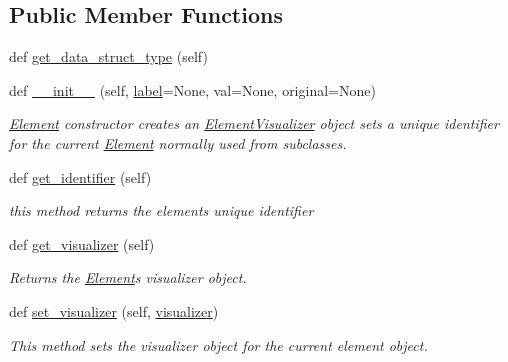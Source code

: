 \subsection*{Public Member Functions}
\begin{DoxyCompactItemize}
\item 
def \mbox{\hyperlink{class_bridges_1_1_element_1_1_element_a3e2a72a74d5cab317aede86b226a4a49}{get\+\_\+data\+\_\+struct\+\_\+type}} (self)
\item 
def \mbox{\hyperlink{class_bridges_1_1_element_1_1_element_a3cf9af1f49a0e03f8e596c637836a7fe}{\+\_\+\+\_\+init\+\_\+\+\_\+}} (self, \mbox{\hyperlink{class_bridges_1_1_element_1_1_element_a301fe5be8cf72b2c62f6a218feeb9166}{label}}=None, val=None, original=None)
\begin{DoxyCompactList}\small\item\em \mbox{\hyperlink{class_bridges_1_1_element_1_1_element}{Element}} constructor creates an \mbox{\hyperlink{namespace_bridges_1_1_element_visualizer}{Element\+Visualizer}} object sets a unique identifier for the current \mbox{\hyperlink{class_bridges_1_1_element_1_1_element}{Element}} normally used from subclasses. \end{DoxyCompactList}\item 
def \mbox{\hyperlink{class_bridges_1_1_element_1_1_element_a84c0f69b4c630b9c25c12ec019e5caaa}{get\+\_\+identifier}} (self)
\begin{DoxyCompactList}\small\item\em this method returns the element\textquotesingle{}s unique identifier \end{DoxyCompactList}\item 
def \mbox{\hyperlink{class_bridges_1_1_element_1_1_element_a02945b22b48bf5517088a0db8b70fa94}{get\+\_\+visualizer}} (self)
\begin{DoxyCompactList}\small\item\em Returns the \mbox{\hyperlink{class_bridges_1_1_element_1_1_element}{Element}}\textquotesingle{}s visualizer object. \end{DoxyCompactList}\item 
def \mbox{\hyperlink{class_bridges_1_1_element_1_1_element_a43898806f4cc199664375bc690fea41e}{set\+\_\+visualizer}} (self, \mbox{\hyperlink{class_bridges_1_1_element_1_1_element_a754c5ca67518e3c9ff6b6e7882ed05c6}{visualizer}})
\begin{DoxyCompactList}\small\item\em This method sets the visualizer object for the current element object. \end{DoxyCompactList}\item 

\end{DoxyCompactItemize}
